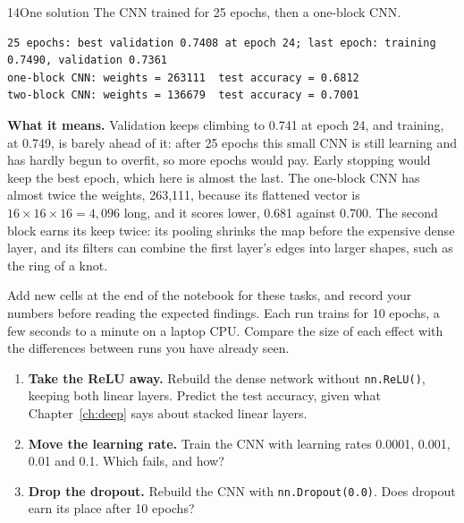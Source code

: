 \begin{labquestion}{14}{One solution}
The CNN trained for 25 epochs, then a one-block CNN.
\end{labquestion}
\begin{labanswer}

\begin{refoutput}
\begin{lstlisting}[style=utpterminal]
25 epochs: best validation 0.7408 at epoch 24; last epoch: training 0.7490, validation 0.7361
one-block CNN: weights = 263111  test accuracy = 0.6812
two-block CNN: weights = 136679  test accuracy = 0.7001
\end{lstlisting}
\end{refoutput}

\textbf{What it means.} Validation keeps climbing to 0.741 at epoch 24, and training, at 0.749, is barely ahead of it: after 25 epochs this small CNN is still learning and has hardly begun to overfit, so more epochs would pay. Early stopping would keep the best epoch, which here is almost the last. The one-block CNN has almost twice the weights, 263,111, because its flattened vector is $16\times16\times16=4{,}096$ long, and it scores lower, 0.681 against 0.700. The second block earns its keep twice: its pooling shrinks the map before the expensive dense layer, and its filters can combine the first layer's edges into larger shapes, such as the ring of a knot.
\end{labanswer}


\begin{yourturn}
Add new cells at the end of the notebook for these tasks, and record your numbers before reading the expected findings. Each run trains for 10 epochs, a few seconds to a minute on a laptop CPU. Compare the size of each effect with the differences between runs you have already seen.
\begin{enumerate}
  \item \textbf{Take the ReLU away.} Rebuild the dense network without \texttt{nn.ReLU()}, keeping both linear layers. Predict the test accuracy, given what Chapter~\ref{ch:deep} says about stacked linear layers.
  \item \textbf{Move the learning rate.} Train the CNN with learning rates 0.0001, 0.001, 0.01 and 0.1. Which fails, and how?
  \item \textbf{Drop the dropout.} Rebuild the CNN with \texttt{nn.Dropout(0.0)}. Does dropout earn its place after 10 epochs?
\end{enumerate}
\end{yourturn}

